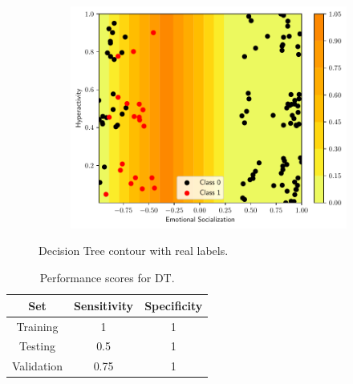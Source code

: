 \begin{figure}
\begin{subfigure}[b]{0.32\textwidth}
        \includegraphics[width=\textwidth]{figs/tree-contour-2-5.pdf}
        \caption{}
    \end{subfigure}
    \caption{Decision Tree contour with real labels.}
    \label{fig:dts}
\end{figure}

\begin{table}
\centering
\caption{Performance scores for DT.}
\label{tab:DT}
\begin{tabular}{ccc}
\hline
\textbf{Set} & \multicolumn{1}{c}{\textbf{Sensitivity}} & \multicolumn{1}{c}{\textbf{Specificity}} \\ \hline
Training & 1 & 1 \\
Testing & 0.5 & 1 \\
Validation & 0.75 & 1 \\ \hline
\end{tabular}
\end{table}
